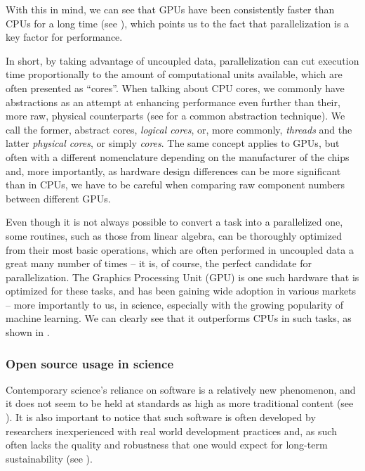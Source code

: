 \documentclass[11pt, conference, onecolumn, final]{IEEEtran}
\begin{document}
With this in mind, we can see that GPUs have been consistently faster than CPUs
for a long time (see \cite{sun2019summarizing}), which points us to the fact
that parallelization is a key factor for performance.

In short, by taking advantage of uncoupled data, parallelization can cut
execution time proportionally to the amount of computational units available,
which are often presented as ``cores''.
When talking about CPU cores, we commonly have abstractions as an attempt at
enhancing performance even further than their, more raw, physical counterparts
(see \cite{magro2002hyper} for a common abstraction technique).
We call the former, abstract cores, \textit{logical cores}, or, more commonly,
\textit{threads} and the latter \textit{physical cores}, or simply
\textit{cores}.
The same concept applies to GPUs, but often with a different nomenclature
depending on the manufacturer of the chips and, more importantly, as hardware
design differences can be more significant than in CPUs, we have to be careful
when comparing raw component numbers between different GPUs.

Even though it is not always possible to convert a  task into a
parallelized one, some routines, such as those from linear algebra, can be
thoroughly optimized from their most basic operations, which are often
performed in uncoupled data a great many number of times -- it is, of course,
the perfect candidate for parallelization.
The Graphics Processing Unit (GPU) is one such hardware that is optimized for
these tasks, and has been gaining wide adoption in various markets -- more
importantly to us, in science, especially with the growing popularity of
machine learning.
We can clearly see that it outperforms CPUs in such tasks, as shown in
\cite{buber2018performance}.

\subsubsection{Open source usage in science} \label{sec:motivation:floss-in-science}

Contemporary science's reliance on software is a relatively new phenomenon, and
it does not seem to be held at standards as high as more traditional content
(see \cite{sufi2014software}).
It is also important to notice that such software is often developed by
researchers inexperienced with real world development practices and, as such
often lacks the quality and robustness that one would expect for long-term
sustainability (see \cite{carver2022survey}).
\end{document}
